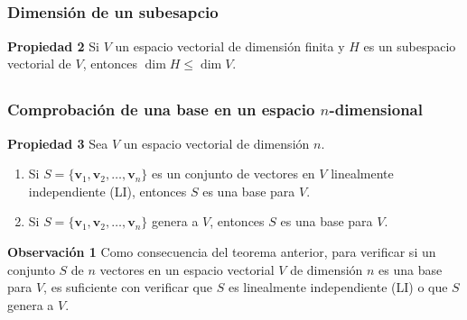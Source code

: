 \subsection{}

\begin{frame}\frametitle{Dimensión de un subesapcio}
	
	\begin{prop}{\textbf{Propiedad 2}}\justifying
		Si $V$ un espacio vectorial de dimensión finita y $H$ es un subespacio vectorial de $V$, entonces $\dim H\leq \dim V$. 
	\end{prop}	
	
		
\end{frame}


\subsection{}

\begin{frame}\frametitle{Comprobación de una base en un espacio $n$-dimensional}

\begin{prop}{\textbf{Propiedad 3}}\justifying
	Sea $V$ un espacio vectorial de dimensión $n$. 
	\begin{enumerate}
		\item[\labelname{$a$}] Si $S=\{\mathbf{v}_1, \mathbf{v}_2, \hdots , \mathbf{v}_n \}$ es un conjunto de vectores en $V$ 
		linealmente independiente (LI), entonces $S$ es una base para $V$.
		\item[\labelname{$b$}] Si $S=\{\mathbf{v}_1, \mathbf{v}_2, \hdots , \mathbf{v}_n \}$ genera a $V$,
		entonces $S$ es una base para $V$.
	\end{enumerate}
\end{prop}	


\begin{alertblock}{\textbf{Observación 1}} \justifying
	Como consecuencia del teorema anterior, para verificar si un conjunto $S$ de $n$ vectores en un
	espacio vectorial $V$ de dimensión $n$ es una base para $V$, es suficiente con verificar que $S$ es
	linealmente independiente (LI) o que $S$ genera a $V$.
\end{alertblock}	

\end{frame}

